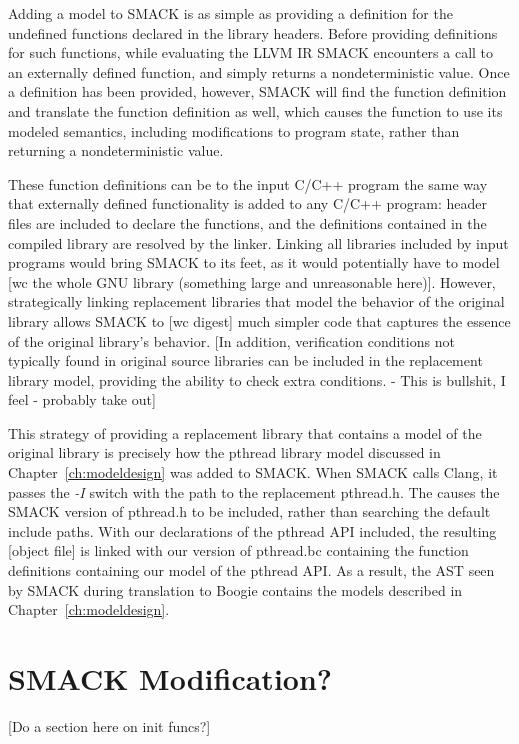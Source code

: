 Adding a model to SMACK is as simple as providing a definition for the
undefined functions declared in the library headers.  Before providing
definitions for such functions, while evaluating the LLVM IR SMACK
encounters a call to an externally defined function, and simply
returns a nondeterministic value.  Once a definition has been
provided, however, SMACK will find the function definition and
translate the function definition as well, which causes the function
to use its modeled semantics, including modifications to program
state,  rather than returning a nondeterministic value.

These function definitions can be to the input C/C++ program the same
way that externally defined functionality is added to any C/C++
program: header files are included to declare the functions, and the
definitions contained in the compiled library are resolved by the
linker.  Linking all libraries included by input programs would bring
SMACK to its feet, as it would potentially have to model [wc the whole
GNU library (something large and unreasonable here)].  However,
strategically linking replacement libraries that model the behavior of
the original library allows SMACK to [wc digest] much simpler code
that captures the essence of the original library's behavior.  [In
addition, verification conditions not typically found in original
source libraries can be included in the replacement library model,
providing the ability to check extra conditions.  - This is bullshit,
I feel - probably take out]

This strategy of providing a replacement library that contains a model
of the original library is precisely how the pthread library model
discussed in Chapter~\ref{ch:modeldesign} was added to SMACK.  When
SMACK calls Clang, it passes the \emph{-I} switch with the path to the
replacement pthread.h.  The causes the SMACK version of pthread.h to
be included, rather than searching the default include paths.  With
our declarations of the pthread API included, the resulting [object
file] is linked with our version of pthread.bc containing the function
definitions containing our model of the pthread API.  As a result, the
AST seen by SMACK during translation to Boogie contains the models
described in Chapter~\ref{ch:modeldesign}.

\section{SMACK Modification?}
[Do a section here on init funcs?]

